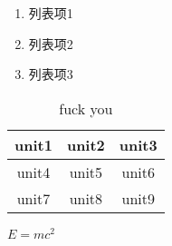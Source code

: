 \documentclass[UTF8]{ctexart}
\begin{document}
    

\begin{enumerate}
    \item 列表项1
    \item 列表项2
    \item 列表项3
\end{enumerate}

\begin{table}
    \caption{fuck you}
    \begin{tabular}{|c|c|c|}
        unit1 & unit2 & unit3 \\
        \hline
        \hline
        \hline
        unit4 & unit5 & unit6 \\
        unit7 & unit8 & unit9
    \end{tabular}
\end{table}
$E=mc^2$
\end{document}
